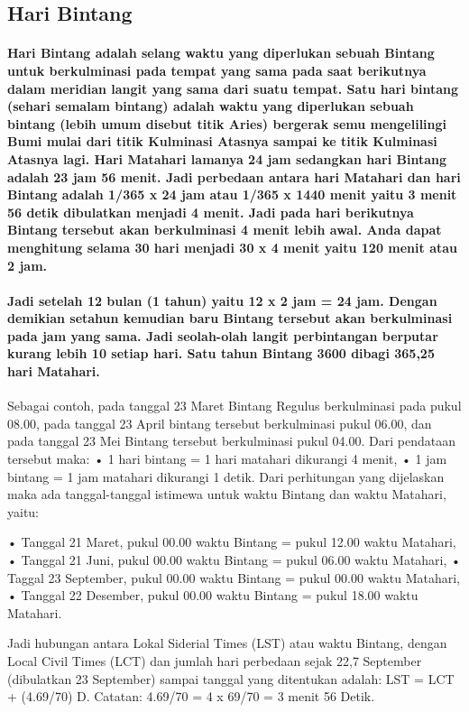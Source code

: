 \subsection{Hari Bintang}
\paragraph{Hari Bintang adalah selang waktu yang diperlukan sebuah Bintang untuk berkulminasi 
 pada tempat yang sama pada saat berikutnya dalam meridian langit yang 
 sama dari suatu tempat. Satu hari bintang (sehari semalam bintang) adalah 
 waktu yang diperlukan sebuah bintang (lebih umum disebut titik Aries) bergerak semu
 mengelilingi Bumi mulai dari titik Kulminasi Atasnya sampai ke titik Kulminasi Atasnya 
 lagi. Hari Matahari lamanya 24 jam sedangkan hari Bintang adalah 23 jam 56 menit. 
 Jadi perbedaan antara hari Matahari dan  hari Bintang adalah 1/365 x 24 jam atau 
 1/365 x 1440 menit yaitu 3 menit 56 detik  dibulatkan menjadi 4 menit. 
 Jadi pada hari berikutnya Bintang tersebut akan  berkulminasi 4 menit lebih awal.
 Anda dapat menghitung selama 30 hari menjadi  30 x 4 menit yaitu 120 menit atau 2 jam.} 

\paragraph{Jadi setelah 12 bulan (1 tahun) yaitu  12 x 2 jam = 24 jam. Dengan demikian setahun
 kemudian baru Bintang tersebut akan berkulminasi pada jam yang sama. 
 Jadi seolah-olah langit perbintangan berputar kurang lebih 10 setiap hari. 
 Satu tahun Bintang 3600 dibagi 365,25 hari Matahari.}

Sebagai contoh, pada tanggal 23 Maret Bintang Regulus berkulminasi pada pukul 08.00,
 pada tanggal 23 April bintang tersebut berkulminasi pukul 06.00, dan pada tanggal 23 Mei 
 Bintang tersebut berkulminasi pukul 04.00. Dari pendataan tersebut maka: 
 • 1 hari bintang = 1 hari matahari dikurangi 4 menit, 
 • 1 jam bintang = 1 jam matahari dikurangi 1 detik. 
 Dari perhitungan yang dijelaskan maka ada tanggal-tanggal istimewa 
 untuk waktu Bintang dan waktu Matahari, yaitu:
 
	• Tanggal 21 Maret, pukul 00.00 waktu Bintang = pukul 12.00 waktu Matahari,
	• Tanggal 21 Juni, pukul 00.00 waktu Bintang = pukul 06.00 waktu Matahari,
	• Taggal 23 September, pukul 00.00 waktu Bintang = pukul 00.00 waktu Matahari,
	• Tanggal 22 Desember, pukul 00.00 waktu Bintang = pukul 18.00 waktu Matahari.
	
 Jadi hubungan antara Lokal Siderial Times (LST) atau waktu Bintang, 
 dengan Local Civil Times (LCT) dan jumlah hari perbedaan sejak 22,7 September 
 (dibulatkan 23 September) sampai tanggal yang ditentukan adalah:
 LST = LCT + (4.69/70) D. Catatan: 4.69/70 = 4 x 69/70 = 3 menit 56 Detik.	
 
